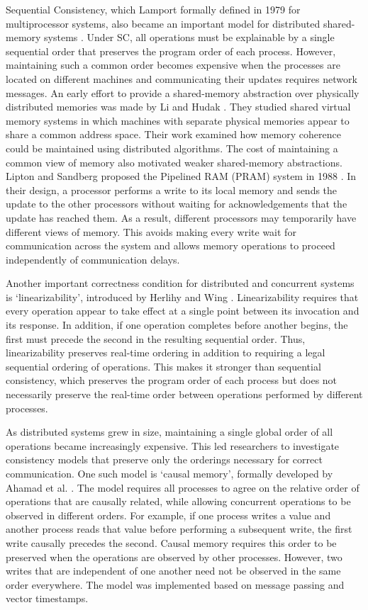 Sequential Consistency, which Lamport formally defined in 1979 for multiprocessor systems, also became an important model for distributed shared-memory systems \cite{lamport1979sc}. Under SC, all operations must be explainable by a single sequential order that preserves the program order of each process. However, maintaining such a common order becomes expensive when the processes are located on different machines and communicating their updates requires network messages. An early effort to provide a shared-memory abstraction over physically distributed memories was made by Li and Hudak \cite{lihudak1986memory}. They studied shared virtual memory systems in which machines with separate physical memories appear to share a common address space. Their work examined how memory coherence could be maintained using distributed algorithms. The cost of maintaining a common view of memory also motivated weaker shared-memory abstractions. Lipton and Sandberg proposed the Pipelined RAM (PRAM) system in 1988 \cite{liptonsandberg1988pram}. In  their design, a processor performs a write to its local memory and sends the update to the other processors without waiting for acknowledgements that the update has reached them. As a result, different processors may temporarily have different views of memory. This avoids making every write wait for communication across the system and allows memory operations to proceed independently of communication delays. 

Another important correctness condition for distributed and concurrent systems is `linearizability', introduced by Herlihy and Wing \cite{herlihywing1990linearizability}. Linearizability requires that every operation appear to take effect at a single point between its invocation and its response. In addition, if one operation completes before another begins, the first must precede the second in the resulting sequential order. Thus, linearizability preserves real-time ordering in addition to requiring a legal sequential ordering of operations. This makes it stronger than sequential consistency, which preserves the program order of each process but does not necessarily preserve the real-time order between operations performed by different processes.

As distributed systems grew in size, maintaining a single global order of all operations became increasingly expensive. This led researchers to investigate consistency models that preserve only the orderings necessary for correct communication. One such model is `causal memory', formally developed by Ahamad et al. \cite{Ahamad1995}. The model requires all processes to agree on the relative order of operations that are causally related, while allowing concurrent operations to be observed in different orders. For example, if one process writes a value and another process reads that value before performing a subsequent write, the first write causally precedes the second. Causal memory requires this order to be preserved when the operations are observed by other processes. However, two writes that are independent of one another need not be observed in the same order everywhere. The model was  implemented based on message passing and vector timestamps. 

